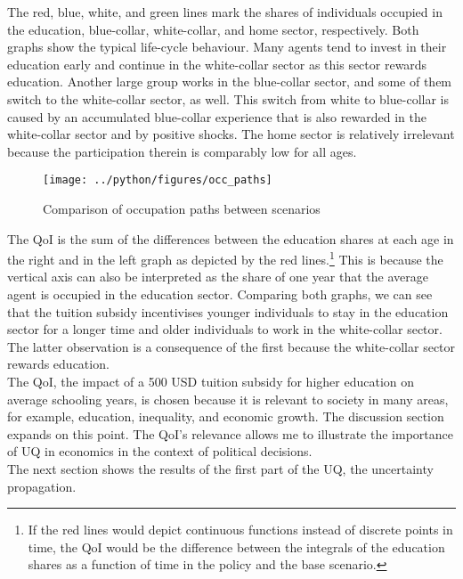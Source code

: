 The red, blue, white, and green lines mark the shares of individuals occupied in the education, blue-collar, white-collar, and home sector, respectively. Both graphs show the typical life-cycle behaviour. Many agents tend to invest in their education early and continue in the white-collar sector as this sector rewards education. Another large group works in the blue-collar sector, and some of them switch to the white-collar sector, as well. This switch from white to blue-collar is caused by an accumulated blue-collar experience that is also rewarded in the white-collar sector and by positive shocks. The home sector is relatively irrelevant because the participation therein is comparably low for all ages.
\begin{figure}[H]
	\caption{Comparison of occupation paths between scenarios}
	\centering
	\texttt{[image: ../python/figures/occ\_paths]}
	\label{fig:paths}
\end{figure}
\noindent
The QoI is the sum of the differences between the education shares at each age in the right and in the left graph as depicted by the red lines.\footnote{If the red lines would depict continuous functions instead of discrete points in time, the QoI would be the difference between the integrals of the education shares as a function of time in the policy and the base scenario.} This is because the vertical axis can also be interpreted as the share of one year that the average agent is occupied in the education sector. Comparing both graphs, we can see that the tuition subsidy incentivises younger individuals to stay in the education sector for a longer time and older individuals to work in the white-collar sector. The latter observation is a consequence of the first because the white-collar sector rewards education.\\
\newline
The QoI, the impact of a 500 USD tuition subsidy for higher education on average schooling years, is chosen because it is relevant to society in many areas, for example, education, inequality, and economic growth. The discussion section expands on this point. The QoI's relevance allows me to illustrate the importance of UQ in economics in the context of political decisions.\\
\newline
The next section shows the results of the first part of the UQ, the uncertainty propagation.

